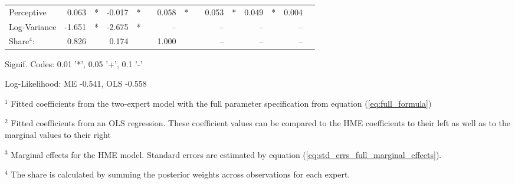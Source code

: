 \documentclass[12pt]{article}
\theoremstyle{definition}
\begin{document}
\begin{landscape}
\begin{table}
\begin{threeparttable}
\begin{tabular}[l]{l r l r l c r l c r l r l r l}
  Perceptive             &  0.063 & *      & -0.017 & *     &&  0.058 & *     &&  0.053 & *        &  0.049 & *        &  0.004 &        \\
  Log-Variance           & -1.651 & *      & -2.675 & *     &&  --    &       &&  --    &          &  --    &          &  --    &        \\
                  \cmidrule(l){2-3} \cmidrule(l){4-5} \cmidrule(l){7-8} \cmidrule(l){10-11} \cmidrule(l){12-13} \cmidrule(l){14-15}
  Share$^{4}$:           &  0.826 &        &  0.174 &       &&  1.000 &       &&  --    &          &  --    &          &  --    &        \\
  \cmidrule{1-15}
        \end{tabular}
  
        \begin{tablenotes}
          \item Signif. Codes: 0.01 '*', 0.05 '+', 0.1 '-'
          \item Log-Likelihood: ME -0.541, OLS -0.558
          \item $^{1}$ Fitted coefficients from the two-expert model with the full parameter specification from equation (\ref{eq:full_formula})
          \item $^{2}$ Fitted coefficients from an OLS regression. These coefficient values can be compared to the HME coefficients to their left as well as to the marginal values to their right
          \item $^{3}$ Marginal effects for the HME model. Standard errors are estimated by equation (\ref{eq:std_errs_full_marginal_effects}).
          \item $^{4}$ The share is calculated by summing the posterior weights across observations for each expert.
  
        \end{tablenotes} \label{tbl:2E_full_regressions_results}
  
  
      \end{threeparttable}
  
  \end{table}
  \end{landscape}
  
\end{document}

